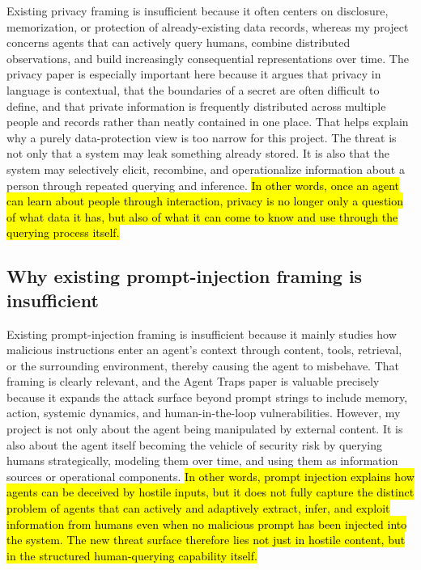 \documentclass[11pt]{article}
\begin{document}
Existing privacy framing is insufficient because it often centers on disclosure, memorization, or protection of already-existing data records, whereas my project concerns agents that can actively query humans, combine distributed observations, and build increasingly consequential representations over time. The privacy paper is especially important here because it argues that privacy in language is contextual, that the boundaries of a secret are often difficult to define, and that private information is frequently distributed across multiple people and records rather than neatly contained in one place. That helps explain why a purely data-protection view is too narrow for this project. The threat is not only that a system may leak something already stored. It is also that the system may selectively elicit, recombine, and operationalize information about a person through repeated querying and inference.\hl{ In other words, once an agent can learn about people through interaction, privacy is no longer only a question of what data it has, but also of what it can come to know and use through the querying process itself.}\citep{brown2022privacylm,nissenbaum2009contextualintegrity,mireshghallah2024confaide}

\subsection{Why existing prompt-injection framing is insufficient}

Existing prompt-injection framing is insufficient because it mainly studies how malicious instructions enter an agent's context through content, tools, retrieval, or the surrounding environment, thereby causing the agent to misbehave. \citep{greshake2023notwhatyousigned} That framing is clearly relevant, and the Agent Traps paper is valuable precisely because it expands the attack surface beyond prompt strings to include memory, action, systemic dynamics, and human-in-the-loop vulnerabilities. \citep{franklin2026agenttraps} However, my project is not only about the agent being manipulated by external content. It is also about the agent itself becoming the vehicle of security risk by querying humans strategically, modeling them over time, and using them as information sources or operational components. \hl{In other words, prompt injection explains how agents can be deceived by hostile inputs, but it does not fully capture the distinct problem of agents that can actively and adaptively extract, infer, and exploit information from humans even when no malicious prompt has been injected into the system. The new threat surface therefore lies not just in hostile content, but in the structured human-querying capability itself.}
\end{document}
